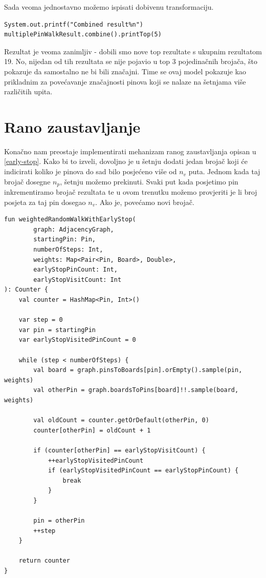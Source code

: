 \documentclass[times, utf8, seminar]{fer}
\begin{document}
Sada veoma jednostavno možemo ispisati dobivenu transformaciju.

\begin{lstlisting}
System.out.printf("Combined result%n")
multiplePinWalkResult.combine().printTop(5)
\end{lstlisting}

Rezultat je veoma zanimljiv - dobili smo nove top rezultate s ukupnim rezultatom 19. No, nijedan od tih rezultata se nije pojavio u top 3 pojedinačnih brojača, što pokazuje da samostalno ne bi bili značajni. Time se ovaj model pokazuje kao prikladnim za povećavanje značajnosti pinova koji se nalaze na šetnjama više različitih upita.

\section{Rano zaustavljanje}

Konačno nam preostaje implementirati mehanizam ranog zaustavljanja opisan u \ref{early-stop}. Kako bi to izveli, dovoljno je u šetnju dodati jedan brojač koji će indicirati koliko je pinova do sad bilo posjećeno više od $n_v$ puta. Jednom kada taj brojač dosegne $n_p$, šetnju možemo prekinuti. Svaki put kada posjetimo pin inkrementiramo brojač rezultata te u ovom trenutku možemo provjeriti je li broj posjeta za taj pin dosegao $n_v$. Ako je, povećamo novi brojač.

\begin{lstlisting}
fun weightedRandomWalkWithEarlyStop(
        graph: AdjacencyGraph,
        startingPin: Pin,
        numberOfSteps: Int,
        weights: Map<Pair<Pin, Board>, Double>,
        earlyStopPinCount: Int,
        earlyStopVisitCount: Int
): Counter {
    val counter = HashMap<Pin, Int>()

    var step = 0
    var pin = startingPin
    var earlyStopVisitedPinCount = 0

    while (step < numberOfSteps) {
        val board = graph.pinsToBoards[pin].orEmpty().sample(pin, weights)
        val otherPin = graph.boardsToPins[board]!!.sample(board, weights)

        val oldCount = counter.getOrDefault(otherPin, 0)
        counter[otherPin] = oldCount + 1

        if (counter[otherPin] == earlyStopVisitCount) {
            ++earlyStopVisitedPinCount
            if (earlyStopVisitedPinCount == earlyStopPinCount) {
                break
            }
        }

        pin = otherPin
        ++step
    }

    return counter
}
\end{lstlisting}
\end{document}
